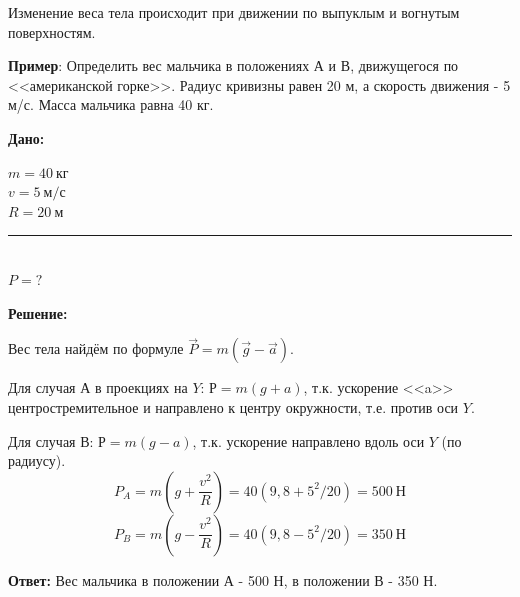 \documentclass[a6paper, 11pt]{diss_4}
\renewcommand{\'}{\,'}
\begin{document}
Изменение веса тела происходит при движении по выпуклым и вогнутым поверхностям.

  \textbf{Пример}: Определить вес мальчика в положениях $А$ и $В$, движущегося
по <<американской горке>>. Радиус кривизны равен 20 м, а скорость движения - 5
м/с. Масса мальчика равна 40 кг.

\hspace{1cm}\textbf{Дано:}\hspace{.3cm}
\parbox[t]{4cm}{
$m=40\ кг$\\
$v=5\ м/с$\\
$R=20\ м$\\
\rule{4cm}{.4pt}\\
$P=?$
}

\textbf{Решение:}

Вес тела найдём по формуле $\vec{P}=m(\vec{g}-\vec{a})$.

Для случая $А$ в проекциях на $Y$: $Р=m(g+a)$, т.к. ускорение <<a>>
центростремительное и направлено к центру окружности, т.е. против оси $Y$.

Для случая $В$: $Р=m(g-a)$, т.к. ускорение направлено вдоль оси $Y$ (по радиусу).
\[
P_A=m(g+\frac{v^2}{R})=40(9,8+5^2/20)=500\ Н
\]
\[
P_B=m(g-\frac{v^2}{R})=40(9,8-5^2/20)=350\ Н
\]

\textbf{Ответ:} Вес мальчика в положении $А$ - 500 Н, в положении $В$ - 350 Н.
\end{document}
